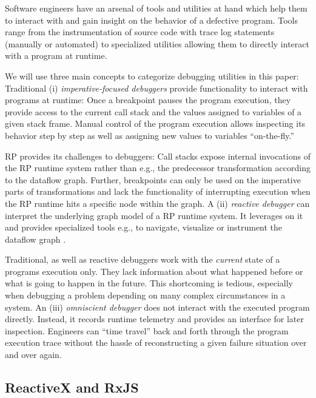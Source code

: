 \documentclass[12pt,a4paper]{article}
\begin{document}
Software engineers have an arsenal of tools and utilities at hand which help them to interact with and gain insight on the behavior of a defective program. Tools range from the instrumentation of source code with trace log statements (manually or automated) to specialized utilities allowing them to directly interact with a program at runtime.

We will use three main concepts to categorize debugging utilities in this paper: Traditional (i) \emph{imperative-focused debuggers} provide functionality to interact with programs at runtime: Once a breakpoint pauses the program execution, they provide access to the current call stack and the values assigned to variables of a given stack frame. Manual control of the program execution allows inspecting its behavior step by step as well as assigning new values to variables ``on-the-fly.''

RP provides its challenges to debuggers: Call stacks expose internal invocations of the RP runtime system rather than e.g., the predecessor transformation according to the dataflow graph. Further, breakpoints can only be used on the imperative parts of transformations and lack the functionality of interrupting execution when the RP runtime hits a specific node within the graph. A (ii) \emph{reactive debugger} can interpret the underlying graph model of a RP runtime system. It leverages on it and provides specialized tools e.g., to navigate, visualize or instrument the dataflow graph \cite{10.1145/2884781.2884815} \cite{10.1145/3180155.3180156} \cite{rxviz}.

Traditional, as well as reactive debuggers work with the \emph{current} state of a programs execution only. They lack information about what happened before or what is going to happen in the future. This shortcoming is tedious, especially when debugging a problem depending on many complex circumstances in a system. An (iii) \emph{omniscient debugger} \cite{5287015} \cite{DBLP:journals/corr/OCallahanJFHNP17} does not interact with the executed program directly. Instead, it records runtime telemetry and provides an interface for later inspection. Engineers can ``time travel'' back and forth through the program execution trace without the hassle of reconstructing a given failure situation over and over again.

\subsection{ReactiveX and RxJS}
\end{document}
